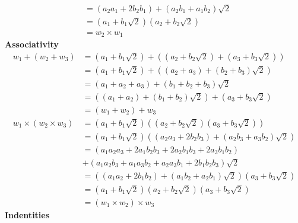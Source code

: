 \documentclass[addpoints]{exam}
\theoremstyle{mytheoremstyle}
\theoremstyle{mytheoremstyle}
\theoremstyle{myproblemstyle}
\begin{document}
\begin{questions}
\begin{parts}
\begin{solution}
\begin{align*}
                                  & = (a_{2}a_{1}+2b_{2}b_{1})+(a_{2}b_{1}+a_{1}b_{2})\sqrt{2} \\
                                  & = (a_{1}+b_{1}\sqrt{2})(a_{2}+b_{2}\sqrt{2})               \\
                                  & = w_{2}\times w_{1}
            \end{align*}
            \textbf{Associativity}
            \begin{align*}
                w_{1}+(w_{2}+w_{3})             & = (a_{1}+b_{1}\sqrt{2})+((a_{2}+b_{2}\sqrt{2})+(a_{3}+b_{3}\sqrt{2}))             \\
                                                & = (a_{1}+b_{1}\sqrt{2})+((a_{2}+a_{3})+(b_{2}+b_{3})\sqrt{2})                     \\
                                                & = (a_{1}+a_{2}+a_{3})+(b_{1}+b_{2}+b_{3})\sqrt{2}                                 \\
                                                & = ((a_{1}+a_{2})+(b_{1}+b_{2})\sqrt{2})+(a_{3}+b_{3}\sqrt{2})                     \\
                                                & = (w_{1}+w_{2})+w_{3}                                                             \\
                w_{1}\times (w_{2}\times w_{3}) & = (a_{1}+b_{1}\sqrt{2})((a_{2}+b_{2}\sqrt{2})(a_{3}+b_{3}\sqrt{2}))               \\
                                                & = (a_{1}+b_{1}\sqrt{2})((a_{2}a_{3}+2b_{2}b_{3})+(a_{2}b_{3}+a_{3}b_{2})\sqrt{2}) \\
                                                & = (a_{1}a_{2}a_{3}+2a_{1}b_{2}b_{3}+2a_{2}b_{1}b_{3}+2a_{3}b_{1}b_{2})            \\
                                                & +(a_{1}a_{2}b_{3}+a_{1}a_{3}b_{2}+a_{2}a_{3}b_{1}+2b_{1}b_{2}b_{3})\sqrt{2}       \\
                                                & = ((a_{1}a_{2}+2b_{1}b_{2})+(a_{1}b_{2}+a_{2}b_{1})\sqrt{2})(a_{3}+b_{3}\sqrt{2}) \\
                                                & = (a_{1}+b_{1}\sqrt{2})(a_{2}+b_{2}\sqrt{2})(a_{3}+b_{3}\sqrt{2})                 \\
                                                & = (w_{1}\times w_{2})\times w_{3}
            \end{align*}
            \textbf{Indentities}

\end{solution}
\end{parts}
\end{questions}
\end{document}
